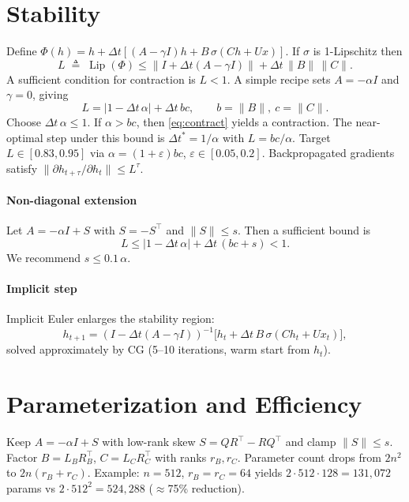 \documentclass[11pt]{article}
\begin{document}
\section{Stability}
Define $\Phi(h)=h+\Delta t[(A-\gamma I)h+B\,\sigma(C h+Ux)]$. If $\sigma$ is 1-Lipschitz then
\begin{equation}\label{eq:contract}
L \;\triangleq\; \operatorname{Lip}(\Phi) \le \big\|I+\Delta t(A-\gamma I)\big\| + \Delta t\,\|B\|\,\|C\|.
\end{equation}
A sufficient condition for contraction is $L<1$. A simple recipe sets $A=-\alpha I$ and $\gamma=0$, giving
\begin{equation}
L = \big|1-\Delta t\,\alpha\big| + \Delta t\, b c,\qquad b=\|B\|,\ c=\|C\|.
\end{equation}
Choose $\Delta t\,\alpha\le 1$. If $\alpha>bc$, then \eqref{eq:contract} yields a contraction. The near-optimal step under this bound is $\Delta t^* = 1/\alpha$ with $L=bc/\alpha$. Target $L\in[0.83,0.95]$ via $\alpha=(1+\varepsilon)bc$, $\varepsilon\in[0.05,0.2]$. Backpropagated gradients satisfy $\|\partial h_{t+\tau}/\partial h_t\|\le L^{\tau}$.

\paragraph{Non-diagonal extension} Let $A=-\alpha I + S$ with $S=-S^\top$ and $\|S\|\le s$. Then a sufficient bound is
\begin{equation}
L \le \big|1-\Delta t\,\alpha\big| + \Delta t\,(bc + s) < 1.
\end{equation}
We recommend $s\le 0.1\,\alpha$.

\paragraph{Implicit step} Implicit Euler enlarges the stability region:
\begin{equation}
 h_{t+1}=(I-\Delta t(A-\gamma I))^{-1}\big[h_t+\Delta t\,B\,\sigma(C h_t + U x_t)\big],
\end{equation}
solved approximately by CG (5--10 iterations, warm start from $h_t$).

\section{Parameterization and Efficiency}
Keep $A=-\alpha I+S$ with low-rank skew $S=Q R^\top - R Q^\top$ and clamp $\|S\|\le s$. Factor $B=L_B R_B^\top$, $C=L_C R_C^\top$ with ranks $r_B,r_C$. Parameter count drops from $2n^2$ to $2n(r_B+r_C)$. Example: $n=512$, $r_B=r_C=64$ yields $2\cdot 512\cdot 128=131{,}072$ params vs $2\cdot 512^2=524{,}288$ (\(\approx\)75\% reduction).
\end{document}

